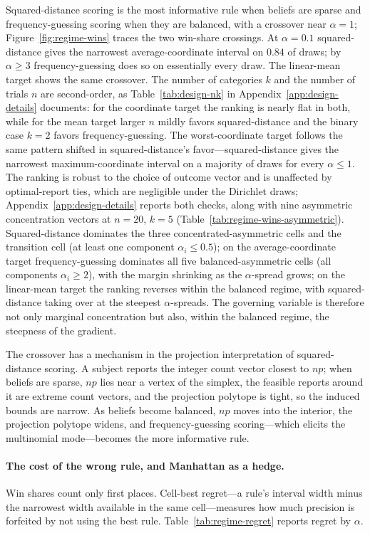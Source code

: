 Squared-distance scoring is the most informative rule when beliefs are sparse and frequency-guessing scoring when they are balanced, with a crossover near \(\alpha=1\); Figure~\ref{fig:regime-wins} traces the two win-share crossings.
At \(\alpha=0.1\) squared-distance gives the narrowest average-coordinate interval on \(0.84\) of draws; by \(\alpha\ge3\) frequency-guessing does so on essentially every draw.
The linear-mean target shows the same crossover.
The number of categories \(k\) and the number of trials \(n\) are second-order, as Table~\ref{tab:design-nk} in Appendix~\ref{app:design-details} documents: for the coordinate target the ranking is nearly flat in both, while for the mean target larger \(n\) mildly favors squared-distance and the binary case \(k=2\) favors frequency-guessing.
The worst-coordinate target follows the same pattern shifted in squared-distance's favor---squared-distance gives the narrowest maximum-coordinate interval on a majority of draws for every \(\alpha\le1\).
The ranking is robust to the choice of outcome vector and is unaffected by optimal-report ties, which are negligible under the Dirichlet draws; Appendix~\ref{app:design-details} reports both checks, along with nine asymmetric concentration vectors at \(n=20\), \(k=5\) (Table~\ref{tab:regime-wins-asymmetric}). Squared-distance dominates the three concentrated-asymmetric cells and the transition cell (at least one component \(\alpha_i\le 0.5\)); on the average-coordinate target frequency-guessing dominates all five balanced-asymmetric cells (all components \(\alpha_i\ge 2\)), with the margin shrinking as the \(\alpha\)-spread grows; on the linear-mean target the ranking reverses within the balanced regime, with squared-distance taking over at the steepest \(\alpha\)-spreads.
The governing variable is therefore not only marginal concentration but also, within the balanced regime, the steepness of the gradient.

The crossover has a mechanism in the projection interpretation of squared-distance scoring.
A subject reports the integer count vector closest to \(np\); when beliefs are sparse, \(np\) lies near a vertex of the simplex, the feasible reports around it are extreme count vectors, and the projection polytope is tight, so the induced bounds are narrow.
As beliefs become balanced, \(np\) moves into the interior, the projection polytope widens, and frequency-guessing scoring---which elicits the multinomial mode---becomes the more informative rule.

\paragraph{The cost of the wrong rule, and Manhattan as a hedge.}
Win shares count only first places.
Cell-best regret---a rule's interval width minus the narrowest width available in the same cell---measures how much precision is forfeited by not using the best rule.
Table~\ref{tab:regime-regret} reports regret by \(\alpha\).

